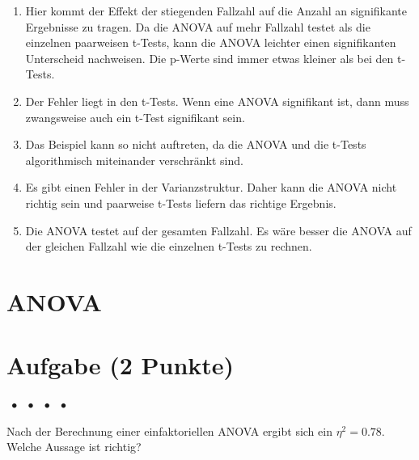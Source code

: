 \documentclass[a4paper, 9pt]{scrartcl}\usepackage[]{graphicx}\usepackage[]{xcolor}
\begin{document}
\begin{enumerate}
\item [\textbf{A} \msquare] Hier kommt der Effekt der stiegenden Fallzahl auf die Anzahl an signifikante Ergebnisse zu tragen. Da die ANOVA auf mehr Fallzahl testet als die einzelnen paarweisen t-Tests, kann die ANOVA leichter einen signifikanten Unterscheid nachweisen. Die p-Werte sind immer etwas kleiner als bei den t-Tests.
\item [\textbf{B} \msquare] Der Fehler liegt in den t-Tests. Wenn eine ANOVA signifikant ist, dann muss zwangsweise auch ein t-Test signifikant sein.
\item [\textbf{C} \msquare] Das Beispiel kann so nicht auftreten, da die ANOVA und die t-Tests algorithmisch miteinander verschränkt sind.
\item [\textbf{D} \msquare] Es gibt einen Fehler in der Varianzstruktur. Daher kann die ANOVA nicht richtig sein und paarweise t-Tests liefern das richtige Ergebnis.
\item [\textbf{E} \msquare] Die ANOVA testet auf der gesamten Fallzahl. Es wäre besser die ANOVA auf der gleichen Fallzahl wie die einzelnen t-Tests zu rechnen.
\end{enumerate}
\section*{ANOVA}

\section{Aufgabe \hfill (2 Punkte)}

\ifcollection
\begin{flushright}
\tiny\vspace{-2Ex}
\textbf{\examinhaltstart}
\exammodulemathstat $\;\bullet$
\exammodulestat $\;\bullet$
\exammodulestatbbv $\;\bullet$
\exammodulestatversuch $\;\bullet$
\exammodulebiostat
\vspace{-1Ex}
\end{flushright}
\fi






Nach der Berechnung einer einfaktoriellen ANOVA ergibt sich ein $\eta^2 = 0.78$. Welche Aussage ist richtig?
\end{document}
